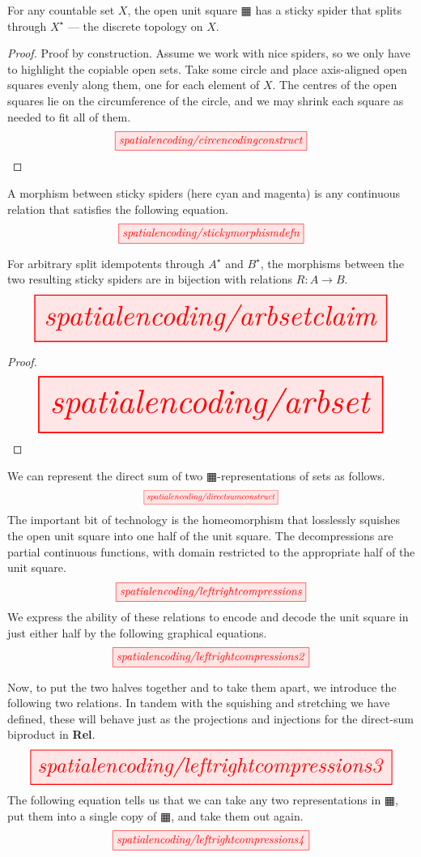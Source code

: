 \begin{lemma}
For any countable set $X$, the open unit square $\squarehvfill$ has a sticky spider that splits through $X^\star$ --- the discrete topology on $X$.
\begin{proof}
Proof by construction. Assume we work with nice spiders, so we only have to highlight the copiable open sets. Take some circle and place axis-aligned open squares evenly along them, one for each element of $X$. The centres of the open squares lie on the circumference of the circle, and we may shrink each square as needed to fit all of them.
\[\scalebox{1}{\tikzfig{spatialencoding/circencodingconstruct}}\]
\end{proof}
\end{lemma}

\begin{defn}
A morphism between sticky spiders (here cyan and magenta) is any continuous relation that satisfies the following equation.
\[\scalebox{1}{\tikzfig{spatialencoding/stickymorphismdefn}}\]
\end{defn}

\begin{lemma}
For arbitrary split idempotents through $A^\star$ and $B^\star$, the morphisms between the two resulting sticky spiders are in bijection with relations $R: A \rightarrow B$.
\[\resizebox{\textwidth}{!}{\tikzfig{spatialencoding/arbsetclaim}}\]
\begin{proof}
\[\resizebox{\textwidth}{!}{\tikzfig{spatialencoding/arbset}}\]
\end{proof}
\end{lemma}

\begin{construction}
We can represent the direct sum of two $\squarehvfill$-representations of sets as follows.
\[\scalebox{0.75}{\tikzfig{spatialencoding/directsumconstruct}}\]
The important bit of technology is the homeomorphism that losslessly squishes the open unit square into one half of the unit square. The decompressions are partial continuous functions, with domain restricted to the appropriate half of the unit square.
\[\scalebox{1}{\tikzfig{spatialencoding/leftrightcompressions}}\]
We express the ability of these relations to encode and decode the unit square in just either half by the following graphical equations.
\[\scalebox{1}{\tikzfig{spatialencoding/leftrightcompressions2}}\]
\end{construction}
Now, to put the two halves together and to take them apart, we introduce the following two relations. In tandem with the squishing and stretching we have defined, these will behave just as the projections and injections for the direct-sum biproduct in \textbf{Rel}.
\[\resizebox{\textwidth}{!}{\tikzfig{spatialencoding/leftrightcompressions3}}\]
The following equation tells us that we can take any two representations in $\squarehvfill$, put them into a single copy of $\squarehvfill$, and take them out again.
\[\scalebox{1}{\tikzfig{spatialencoding/leftrightcompressions4}}\]

